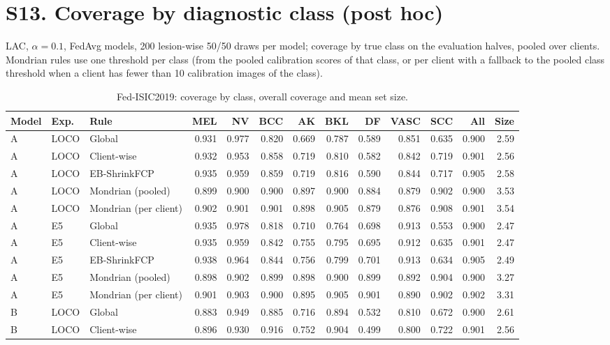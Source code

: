 \documentclass[10pt]{article}
\begin{document}
\section*{S13. Coverage by diagnostic class (post hoc)}
LAC, $\alpha=0.1$, FedAvg models, 200 lesion-wise 50/50 draws per model; coverage by true class on the evaluation halves, pooled over clients. Mondrian rules use one threshold per class (from the pooled calibration scores of that class, or per client with a fallback to the pooled class threshold when a client has fewer than 10 calibration images of the class).
\begin{table}[!htbp]
\centering
\scriptsize
\caption{Fed-ISIC2019: coverage by class, overall coverage and mean set size.}
\label{tab:s14}
\begin{tabular}{@{}lllrrrrrrrrrr@{}}
\toprule
Model & Exp. & Rule & MEL & NV & BCC & AK & BKL & DF & VASC & SCC & All & Size \\
\midrule
A & LOCO & Global & 0.931 & 0.977 & 0.820 & 0.669 & 0.787 & 0.589 & 0.851 & 0.635 & 0.900 & 2.59 \\
A & LOCO & Client-wise & 0.932 & 0.953 & 0.858 & 0.719 & 0.810 & 0.582 & 0.842 & 0.719 & 0.901 & 2.56 \\
A & LOCO & EB-ShrinkFCP & 0.935 & 0.959 & 0.859 & 0.719 & 0.816 & 0.590 & 0.844 & 0.717 & 0.905 & 2.58 \\
A & LOCO & Mondrian (pooled) & 0.899 & 0.900 & 0.900 & 0.897 & 0.900 & 0.884 & 0.879 & 0.902 & 0.900 & 3.53 \\
A & LOCO & Mondrian (per client) & 0.902 & 0.901 & 0.901 & 0.898 & 0.905 & 0.879 & 0.876 & 0.908 & 0.901 & 3.54 \\
\midrule
A & E5 & Global & 0.935 & 0.978 & 0.818 & 0.710 & 0.764 & 0.698 & 0.913 & 0.553 & 0.900 & 2.47 \\
A & E5 & Client-wise & 0.935 & 0.959 & 0.842 & 0.755 & 0.795 & 0.695 & 0.912 & 0.635 & 0.901 & 2.47 \\
A & E5 & EB-ShrinkFCP & 0.938 & 0.964 & 0.844 & 0.756 & 0.799 & 0.701 & 0.913 & 0.634 & 0.905 & 2.49 \\
A & E5 & Mondrian (pooled) & 0.898 & 0.902 & 0.899 & 0.898 & 0.900 & 0.899 & 0.892 & 0.904 & 0.900 & 3.27 \\
A & E5 & Mondrian (per client) & 0.901 & 0.903 & 0.900 & 0.895 & 0.905 & 0.901 & 0.890 & 0.902 & 0.902 & 3.31 \\
\midrule
B & LOCO & Global & 0.883 & 0.949 & 0.885 & 0.716 & 0.894 & 0.532 & 0.810 & 0.672 & 0.900 & 2.61 \\
B & LOCO & Client-wise & 0.896 & 0.930 & 0.916 & 0.752 & 0.904 & 0.499 & 0.800 & 0.722 & 0.901 & 2.56 \\

\end{tabular}
\end{table}
\end{document}
